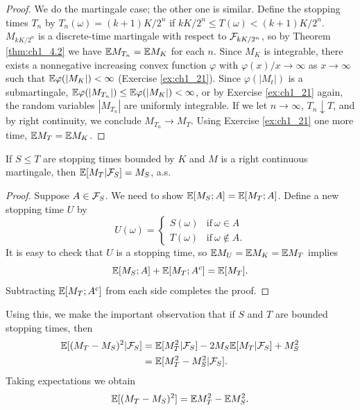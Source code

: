 \begin{proof}
We do the martingale case; the other one is similar. Define the stopping times $T_n$ by $T_n(\omega) = (k + 1)K/2^n$ if $kK/2^n \leq T(\omega) < (k+1)K/2^n$. $M_{kK/2^n}$ is a discrete-time martingale with respect to $\mathcal{F}_{kK/2^n}$, so by Theorem \ref{thm:ch1_4.2} we have $\mathbb{E} M_{T_n} = \mathbb{E} M_K$ for each $n$. Since $M_K$ is integrable, there exists a nonnegative increasing convex function $\varphi$ with $\varphi(x)/x \to \infty$ as $x \to \infty$ such that $\mathbb{E}\varphi(|M_K|) < \infty$ (Exercise \ref{ex:ch1_21}). Since $\varphi(|M_t|)$ is a submartingale, $\mathbb{E}\varphi(|M_{T_n}|) \leq \mathbb{E}\varphi(|M_K|) < \infty$, or by Exercise \ref{ex:ch1_21} again, the random variables $|M_{T_n}|$ are uniformly integrable. If we let $n \to \infty$, $T_n \downarrow T$, and by right continuity, we conclude $M_{T_n} \to M_T$. Using Exercise \ref{ex:ch1_21} one more time, $\mathbb{E} M_T = \mathbb{E} M_K$.
\end{proof}

\begin{corollary}\label{cor:ch1_4.5}
If $S \leq T$ are stopping times bounded by $K$ and $M$ is a right continuous martingale, then $\mathbb{E}[M_T| \mathcal{F}_S] = M_S$, a.s.
\end{corollary}

\begin{proof}
Suppose $A \in \mathcal{F}_S$. We need to show $\mathbb{E}[M_S;A] = \mathbb{E}[M_T;A]$. Define a new stopping time $U$ by
\[
    U(\omega) = \begin{cases}
        S(\omega) & \text{if}~\omega \in A\\
        T(\omega) & \text{if}~\omega \notin A.
    \end{cases}
\]
It is easy to check that $U$ is a stopping time, so $\mathbb{E} M_U = \mathbb{E} M_K = \mathbb{E} M_T$ implies
\[
    \mathbb{E}[M_S;A] + \mathbb{E}[M_T;A^c] = \mathbb{E}[M_T].
\]
Subtracting $\mathbb{E}[M_T;A^c]$ from each side completes the proof.
\end{proof}

Using this, we make the important observation that if $S$ and $T$ are bounded stopping times, then
\begin{align}\label{eq:ch1_4.3}
    \mathbb{E}[(M_T - M_S)^2|\mathcal{F}_S] &= \mathbb{E}[M_T^2| \mathcal{F}_S] - 2M_S\mathbb{E}[M_T|\mathcal{F}_S] + M_S^2 \\
    &= \mathbb{E}[M_T^2 - M_S^2| \mathcal{F}_S]. \notag
\end{align}
Taking expectations we obtain
\begin{equation}\label{eq:ch1_4.4}
    \mathbb{E}[(M_T - M_S)^2] = \mathbb{E} M_T^2 - \mathbb{E} M_S^2.
\end{equation}

